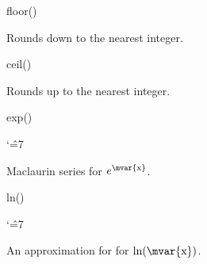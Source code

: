 \begin{math-function}{floor()}

	Rounds  down to the nearest integer. 
	
\begin{codeexample}[]
 \pgfmathresult
\end{codeexample}

\begin{codeexample}[]
 \pgfmathresult
\end{codeexample}

\end{math-function}

\begin{math-function}{ceil()}

	Rounds  up to the nearest integer. 

\begin{codeexample}[]
 \pgfmathresult
\end{codeexample}

\begin{codeexample}[]
 \pgfmathresult
\end{codeexample}

\end{math-function}

\begin{math-function}{exp()}
{
\catcode`\^=7

	Maclaurin series for $e^\textrm{\mvar{x}}$. 
}	
\begin{codeexample}[]
 \pgfmathresult
\end{codeexample}

\begin{codeexample}[]
 \pgfmathresult
\end{codeexample}

\end{math-function}


\begin{math-function}{ln()}
{
\catcode`\^=7

	An approximation for for $\ln(\textrm{\mvar{x}})$. 
}	
\begin{codeexample}[]
 \pgfmathresult
\end{codeexample}

\begin{codeexample}[]
 \pgfmathresult
\end{codeexample}

\end{math-function}

